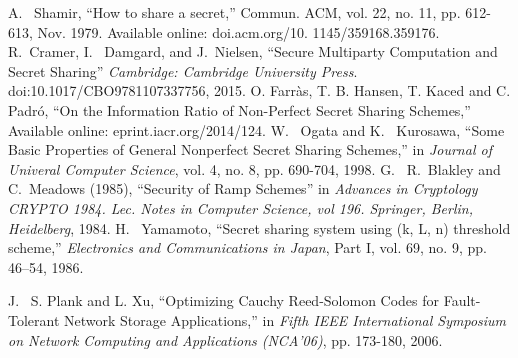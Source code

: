 \documentclass[conference]{IEEEtran}
\begin{document}
\begin{thebibliography}{00}
A. ~Shamir, ``How to share a secret,'' Commun. ACM, vol. 22, no. 11,
pp. 612-613, Nov. 1979. Available online: {doi.acm.org/10.
	1145/359168.359176}.
R.~Cramer, I.~ Damgard, and J.~Nielsen,  ``Secure Multiparty Computation and Secret Sharing'' \emph{Cambridge: Cambridge University Press}. doi:{10.1017/CBO9781107337756}, 2015.
O. Farr\`{a}s, T. B. Hansen, T. Kaced and C. Padr\'{o}, ``On the Information Ratio of Non-Perfect Secret Sharing Schemes,'' Available online: {eprint.iacr.org/2014/124}.
W. ~Ogata and K. ~Kurosawa, ``Some Basic Properties of General Nonperfect Secret Sharing Schemes,'' in \emph{Journal of Univeral Computer Science}, vol. 4, no. 8, pp. 690-704, 1998.
G.~ R.~Blakley and C.~Meadows (1985), ``Security of Ramp Schemes'' in \emph{Advances in Cryptology CRYPTO 1984. Lec. Notes in Computer Science, vol 196. Springer, Berlin, Heidelberg}, 1984.
H. ~Yamamoto, ``Secret sharing system using (k, L, n) threshold scheme,'' \emph{Electronics and Communications in Japan}, Part I, vol. 69, no. 9, pp. 46–54, 1986.

J. ~S. Plank and L. Xu, ``Optimizing Cauchy Reed-Solomon Codes for Fault-Tolerant Network Storage Applications,'' in \textit{Fifth IEEE International Symposium on Network Computing and Applications (NCA'06)}, pp. 173-180, 2006.
\end{thebibliography}
\end{document}
